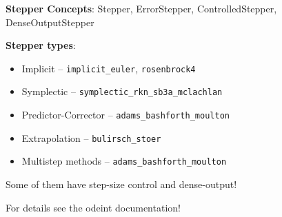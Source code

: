 \begin{frame}[fragile]
\end{frame}





\begin{frame}

 \vspace{2ex}

 {\bf Stepper Concepts}: Stepper, ErrorStepper, ControlledStepper, DenseOutputStepper

 \vspace{2ex}

 {\bf Stepper types}: 
 \begin{itemize}
  \item Implicit -- {\tt implicit\_euler}, {\tt rosenbrock4}
  \item Symplectic -- {\tt symplectic\_rkn\_sb3a\_mclachlan}
  \item Predictor-Corrector -- {\tt adams\_bashforth\_moulton}
  \item Extrapolation -- {\tt bulirsch\_stoer}
  \item Multistep methods -- {\tt adams\_bashforth\_moulton}
 \end{itemize}

 \vspace{2ex}
 Some of them have step-size control and dense-output!

 \vspace{2ex}

 For details see the odeint documentation!

\end{frame}
